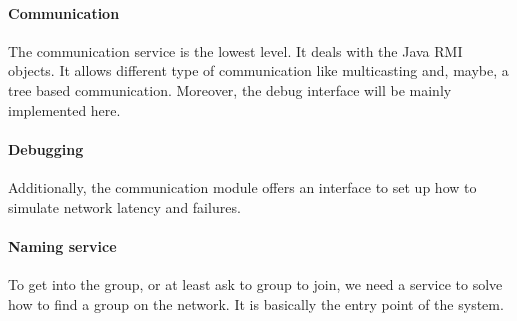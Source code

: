 \paragraph{Communication}{
	The communication service is the lowest level. It deals
 with the Java RMI objects. It allows different type of
 communication like multicasting and, maybe, a tree based
 communication. \newline
 Moreover, the debug interface will be mainly implemented here.
}

\paragraph{Debugging}{
	Additionally, the communication module offers an interface
 to set up how to simulate network latency and failures.
}

\paragraph{Naming service}{
	To get into the group, or at least ask to group to join,
 we need a service to solve how to find a group on the network.
 It is basically the entry point of the system.
}
